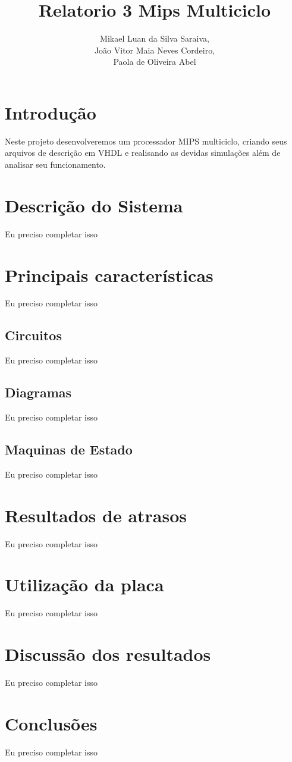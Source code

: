\documentclass{article}
\title{Relatorio 3 \- Mips Multiciclo}
\author{%
    Mikael Luan da Silva Saraiva, \\
    João Vitor Maia Neves Cordeiro, \\
    Paola de Oliveira Abel
    }
\begin{document}
    \maketitle

    \section{Introdução}

    Neste projeto desenvolveremos um processador MIPS multiciclo, criando seus
    arquivos de descrição em VHDL e realisando as devidas simulações além de
    analisar seu funcionamento.

    \section{Descrição do Sistema}

    Eu preciso completar isso

    \section{Principais características}

    Eu preciso completar isso

    \subsection{Circuitos}

    Eu preciso completar isso

    \subsection{Diagramas}

    Eu preciso completar isso

    \subsection{Maquinas de Estado}

    Eu preciso completar isso

    \section{Resultados de atrasos}

    Eu preciso completar isso

    \section{Utilização da placa}

    Eu preciso completar isso

    \section{Discussão dos resultados}

    Eu preciso completar isso

    \section{Conclusões}

    Eu preciso completar isso
\end{document}
